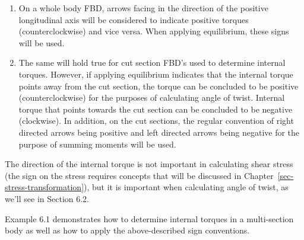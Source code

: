\documentclass[
  letterpaper,
  DIV=11,
  numbers=noendperiod]{scrreprt}
\providecommand{\tightlist}{%
  \setlength{\itemsep}{0pt}\setlength{\parskip}{0pt}}\usepackage{longtable,booktabs,array}
\theoremstyle{definition}
\theoremstyle{remark}
\begin{document}
\begin{enumerate}
\def\labelenumi{\arabic{enumi}.}
\tightlist
\item
  On a whole body FBD, arrows facing in the direction of the positive
  longitudinal axis will be considered to indicate positive torques
  (counterclockwise) and vice versa. When applying equilibrium, these
  signs will be used.
\item
  The same will hold true for cut section FBD's used to determine
  internal torques. However, if applying equilibrium indicates that the
  internal torque points away from the cut section, the torque can be
  concluded to be positive (counterclockwise) for the purposes of
  calculating angle of twist. Internal torque that points towards the
  cut section can be concluded to be negative (clockwise). In addition,
  on the cut sections, the regular convention of right directed arrows
  being positive and left directed arrows being negative for the purpose
  of summing moments will be used.
\end{enumerate}

The direction of the internal torque is not important in calculating
shear stress (the sign on the stress requires concepts that will be
discussed in Chapter~\ref{sec-stress-transformation}), but it is
important when calculating angle of twist, as we'll see in Section 6.2.

Example 6.1 demonstrates how to determine internal torques in a
multi-section body as well as how to apply the above-described sign
conventions.
\end{document}
